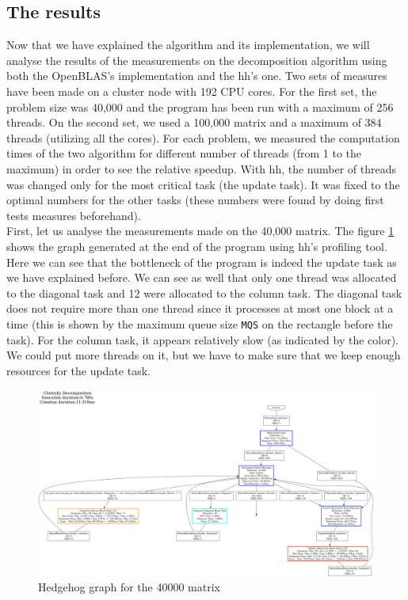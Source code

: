 \clearpage{}
\subsection{The results}
\label{sec:chores}

Now that we have explained the algorithm and its implementation, we will analyse
the results of the measurements on the decomposition algorithm using both the
OpenBLAS's implementation and the \gls{hh}'s one. Two sets of measures have been
made on a cluster node with 192 CPU cores. For the first set, the problem size
was 40,000 and the program has been run with a maximum of
256 threads. On the second set, we used a 100,000 matrix and a maximum of
384 threads (utilizing all the cores). For each problem, we measured the
computation times of the two algorithm for different number of threads (from
1 to the maximum) in order to see the relative speedup. With \gls{hh}, the
number of threads was changed only for the most critical task (the update
task). It was fixed to the optimal numbers for the other tasks (these
numbers were found by doing first tests measures beforehand).\\

First, let us analyse the measurements made on the 40,000 matrix. The figure
\ref{fig:40000graph} shows the graph generated at the end of the program using
\gls{hh}'s profiling tool. Here we can see that the bottleneck of the program is
indeed the update task as we have explained before. We can see as well that only
one thread was allocated to the diagonal task and 12 were allocated to the
column task. The diagonal task does not require more than one thread since it
processes at most one block at a time (this is shown by the maximum queue size
\texttt{MQS} on the rectangle before the task). For the column task, it appears
relatively slow (as indicated by the color). We could put more threads on it, but
we have to make sure that we keep enough resources for the update task.

\begin{figure}[!ht]
  \begin{center}
    \includegraphics[scale=0.15]{img/cho-img/40000.png}
    \caption{Hedgehog graph for the 40000 matrix}
    \label{fig:40000graph}
  \end{center}
\end{figure}

